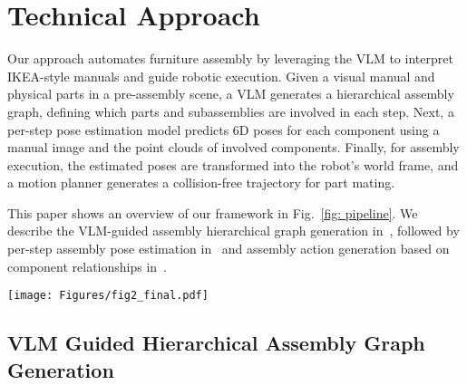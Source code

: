 \section{Technical Approach}
Our approach automates furniture assembly by leveraging the VLM to interpret IKEA-style manuals and guide robotic execution. Given a visual manual and physical parts in a pre-assembly scene, a VLM generates a hierarchical assembly graph, defining which parts and subassemblies are involved in each step. Next, a per-step pose estimation model predicts 6D poses for each component using a manual image and the point clouds of involved components. Finally, for assembly execution, the estimated poses are transformed into the robot's world frame, and a motion planner generates a collision-free trajectory for part mating. 

This paper shows an overview of our framework in Fig.~\ref{fig: pipeline}. We describe the VLM-guided assembly hierarchical graph generation in~, followed by per-step assembly pose estimation in~ and assembly action generation based on component relationships in~.

\begin{figure*}[htb!]
\centering
\texttt{[image: Figures/fig2\_final.pdf]} 
\caption{\textbf{Framework Overview.} (1) GPT-4o \cite{achiam2023gpt} is queried with manual pages to generate a sequential assembly plan, represented as a hierarchical assembly graph. 
(2) The furniture components’ point clouds and corresponding manual images are processed by a pose estimation module to predict target poses for each component. (3) The system sequentially executes the assembly by planning and performing robotic actions based on the hierarchical assembly graph and estimated poses.}
\label{fig: pipeline}
\end{figure*}

\subsection{VLM Guided Hierarchical Assembly Graph Generation}
\label{sec:graph_gen_full_desc}

